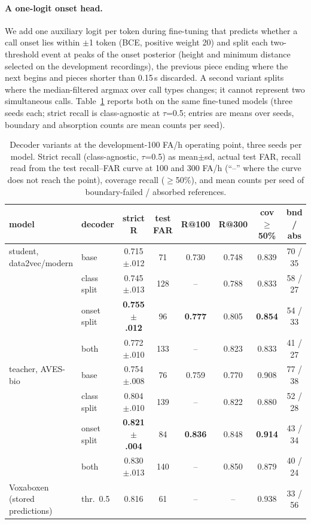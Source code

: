 \documentclass[10pt,twocolumn]{article}
\begin{document}
\paragraph{A one-logit onset head.} We add one auxiliary logit per token during fine-tuning that predicts whether a call onset lies within $\pm$1 token (BCE, positive weight 20) and split each two-threshold event at peaks of the onset posterior (height and minimum distance selected on the development recordings), the previous piece ending where the next begins and pieces shorter than 0.15\,s discarded. A second variant splits where the median-filtered argmax over call types changes; it cannot represent two simultaneous calls. Table~\ref{tab:bouts} reports both on the same fine-tuned models (three seeds each; strict recall is class-agnostic at $\tau$=0.5; entries are means over seeds, boundary and absorption counts are mean counts per seed).

\begin{table}[t]\centering\footnotesize
\caption{Decoder variants at the development-100 FA/h operating point, three seeds per model. Strict recall (class-agnostic, $\tau$=0.5) as mean$\pm$sd, actual test FAR, recall read from the test recall--FAR curve at 100 and 300 FA/h (``--'' where the curve does not reach the point), coverage recall ($\ge$50\%), and mean counts per seed of boundary-failed / absorbed references.}
\label{tab:bouts}
\begin{tabular}{llcccccc}\toprule
model & decoder & strict R & test FAR & R@100 & R@300 & cov$\ge$50\% & bnd / abs\\\midrule
student, data2vec/modern & base & 0.715$\pm$.012 & 71 & 0.730 & 0.748 & 0.839 & 70 / 35\\
 & class split & 0.745$\pm$.013 & 128 & -- & 0.788 & 0.833 & 58 / 27\\
 & onset split & \textbf{0.755$\pm$.012} & 96 & \textbf{0.777} & 0.805 & \textbf{0.854} & 54 / 33\\
 & both & 0.772$\pm$.010 & 133 & -- & 0.823 & 0.833 & 41 / 27\\\midrule
teacher, AVES-bio & base & 0.754$\pm$.008 & 76 & 0.759 & 0.770 & 0.908 & 77 / 38\\
 & class split & 0.804$\pm$.010 & 139 & -- & 0.822 & 0.880 & 52 / 28\\
 & onset split & \textbf{0.821$\pm$.004} & 84 & \textbf{0.836} & 0.848 & \textbf{0.914} & 43 / 34\\
 & both & 0.830$\pm$.013 & 140 & -- & 0.850 & 0.879 & 40 / 24\\\midrule
Voxaboxen (stored predictions) & thr.\ 0.5 & 0.816 & 61 & -- & -- & 0.938 & 33 / 56\\
\bottomrule\end{tabular}\end{table}
\end{document}
